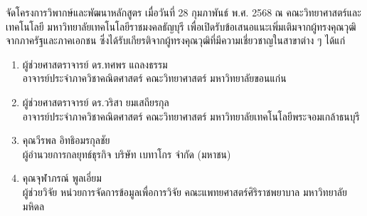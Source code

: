 จัดโครงการวิพากษ์และพัฒนาหลักสูตร เมื่อวันที่ 28 กุมภาพันธ์ พ.ศ. 2568 ณ คณะวิทยาศาสตร์และเทคโนโลยี มหาวิทยาลัยเทคโนโลยีราชมงคลธัญบุรี เพื่อเปิดรับข้อเสนอแนะเพิ่มเติมจากผู้ทรงคุณวุฒิจากภาครัฐและภาคเอกชน ซึ่งได้รับเกียรติจากผู้ทรงคุณวุฒิที่มีความเชี่ยวชาญในสาขาต่าง ๆ ได้แก่ 
\begin{enumerate}
	\item ผู้ช่วยศาสตราจารย์ ดร.ทศพร แถลงธรรม \\อาจารย์ประจำภาควิชาคณิตศาสตร์ คณะวิทยาศาสตร์ มหาวิทยาลัยขอนแก่น
	\item ผู้ช่วยศาสตราจารย์ ดร.วริสา ยมเสถียรกุล \\อาจารย์ประจำภาควิชาคณิตศาสตร์ คณะวิทยาศาสตร์ มหาวิทยาลัยเทคโนโลยีพระจอมเกล้าธนบุรี	
	\item คุณวีรพล อิทธิอมรกุลชัย \\ผู้อำนวยการกลยุทธ์ธุรกิจ บริษัท เบทาโกร จำกัด (มหาชน)
	\item คุณจุฬาภรณ์ พูลเอี่ยม \\ผู้ช่วยวิจัย หน่วยการจัดการข้อมูลเพื่อการวิจัย คณะแพทยศาสตร์ศิริราชพยาบาล มหาวิทยาลัยมหิดล
\end{enumerate}


\begin{doclist}
\end{doclist}

































